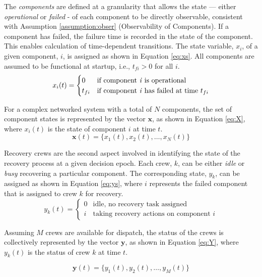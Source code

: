 \documentclass[conference]{IEEEtran}
\begin{document}
The \emph{components} are defined at a granularity that allows the state — either \emph{operational} or \emph{failed} -  of each component to be directly observable, consistent with Assumption \ref{assumption:obser} (Observability of Components). If a component has failed, the failure time is recorded in the state of the component. This enables calculation of time-dependent transitions. The state variable, $x_i$, of a given component, $i$, is assigned as shown in Equation \ref{eq:xs}. All components are assumed to be functional at startup, i.e., $t_{fi}>0$ for all $i$.
\begin{equation} x_i (t)= \begin{cases}
    0 & \text{if component \textit{i} is operational}  \\
    t_{fi} & \text{if component \textit{i} has failed at time $t_{fi}$}
    \label{eq:xs}
\end{cases}\end{equation}

For a complex networked system with a total of $N$ components, the set of component states is represented by the vector $\mathbf{x}$, as shown in Equation \ref{eq:X}, where $x_i(t)$ is the state of component $i$ at time $t$. 
\begin{equation}
\mathbf{x} (t) = \{ x_1(t), x_2(t), \ldots , x_N(t) \}
\label{eq:X}
\end{equation}

Recovery crews are the second aspect involved in identifying the state of the recovery process at a given decision epoch. Each crew, $k$, can be either \emph{idle} or \emph{busy} recovering a particular component. The corresponding state, $y_k$, can be assigned as shown in Equation \ref{eq:ys}, where $i$ represents the failed component that is assigned to crew $k$ for recovery. 
\begin{equation} y_k (t)= \begin{cases}
    0 & \text{idle, no recovery task assigned} \\
    i & \text{taking recovery actions on component $i$}
    \label{eq:ys}
\end{cases}\end{equation}

Assuming $M$ crews are available for dispatch, the status of the crews is collectively represented by the vector $\mathbf{y}$, as shown in Equation \ref{eq:Y}, where $y_k(t)$ is the status of crew $k$ at time $t$. 

\begin{equation}
\mathbf{y}(t) = \{ y_1(t), y_2(t), \ldots , y_M(t) \}
\label{eq:Y}
\end{equation}
\end{document}
